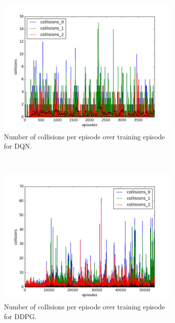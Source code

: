 \begin{figure}[h]
  \begin{subfigure}[h]{\figscale\linewidth}
    \includegraphics[trim=10 10 10 10,clip,width=\linewidth]
    {../results/dqn_2vs1/collisions.png}
    \caption{Number of collisions per episode over training episode for DQN.}
    \label{fig:dqn-2vs1-collisions}
  \end{subfigure}
  ~
  \begin{subfigure}[h]{\figscale\linewidth}
    \includegraphics[trim=10 10 10 10,clip,width=\linewidth]
    {../results/ddpg_2vs1/collisions.png}
    \caption{Number of collisions per episode over training episode for DDPG.}
    \label{fig:ddpg-2vs1-collisions}
  \end{subfigure}
  ~
  \begin{subfigure}[h]{\figscale\linewidth}

\end{subfigure}
\end{figure}
